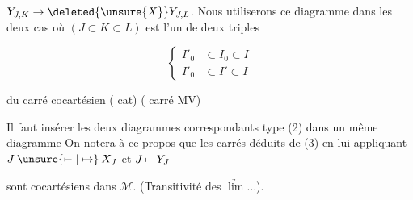 
$Y_{J,K}\to\deleted{\unsure{X}}Y_{J,L}$. Nous utiliserons ce diagramme dans les deux cas où $(J\subset K\subset L)$ est l’un de deux triples

\[
 \left\{\begin{aligned}
 I'_0&\subset I_0\subset I\\
 I'_0&\subset I'\subset I
 \end{aligned}\right.
\]

 du carré cocartésien ( cat) ( carré MV)


Il faut insérer les deux diagrammes correspondants  type (2) dans un même diagramme  On notera à ce propos que les carrés  déduits de (3) en lui appliquant  $J\mathbin{\unsure{\mapstochar\relbar|\mapsto}}X_J$ et $J\mathbin{\mapstochar\relbar}Y_J$


sont cocartésiens dans $\mathcal M$. (Transitivité des $\underrightarrow{\lim}\ldots$).

